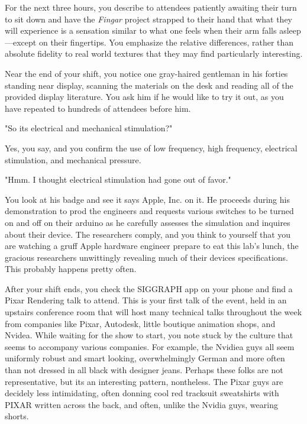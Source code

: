 \documentclass[../main.tex]{subfiles}
\begin{document}
For the next three hours, you describe to attendees patiently awaiting their turn to sit down and have the \textit{Fingar} project strapped to their hand that what they will experience is a sensation similar to what one feels when their arm falls asleep---except on their fingertips. You emphasize the relative differences, rather than absolute fidelity to real world textures that they may find particularly interesting.

Near the end of your shift, you notice one gray-haired gentleman in his forties standing near display, scanning the materials on the desk and reading all of the provided display literature. You ask him if he would like to try it out, as you have repeated to hundreds of attendees before him.

"So its electrical and mechanical stimulation?"

Yes, you say, and you confirm the use of low frequency, high frequency, electrical stimulation, and mechanical pressure.

"Hmm. I thought electrical stimulation had gone out of favor."

You look at his badge and see it says Apple, Inc. on it. He proceeds during his demonstration to prod the engineers and requests various switches to be turned on and off on their arduino as he carefully assesses the simulation and inquires about their device. The researchers comply, and you think to yourself that you are watching a gruff Apple hardware engineer prepare to eat this lab's lunch, the gracious researchers unwittingly revealing much of their devices specifications. This probably happens pretty often.

After your shift ends, you check the SIGGRAPH app on your phone and find a Pixar Rendering talk to attend. This is your first talk of the event, held in an upstairs conference room that will host many technical talks throughout the week from companies like Pixar, Autodesk, little boutique animation shops, and Nvidea. While waiting for the show to start, you note stuck by the culture that seems to accompany various companies. For example, the Nvidiea guys all seem uniformly robust and smart looking, overwhelmingly German and more often than not dressed in all black with designer jeans. Perhaps these folks are not representative, but its an interesting pattern, nontheless. The Pixar guys are decidely less intimidating, often donning cool red tracksuit sweatshirts with PIXAR written across the back, and often, unlike the Nvidia guys, wearing shorts.
\end{document}

